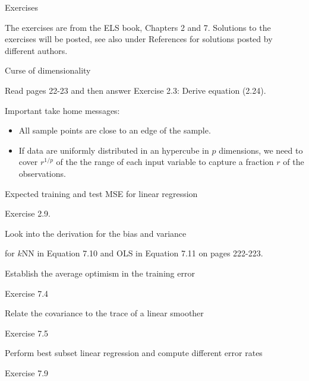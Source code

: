 \documentclass[
  ignorenonframetext,
]{beamer}
\providecommand{\tightlist}{%
  \setlength{\itemsep}{0pt}\setlength{\parskip}{0pt}}
\begin{document}
\begin{frame}{Exercises}
\protect\hypertarget{exercises}{}

The exercises are from the ELS book, Chapters 2 and 7. Solutions to the
exercises will be posted, see also under References for solutions posted
by different authors.

\begin{block}{Curse of dimensionality}

Read pages 22-23 and then answer Exercise 2.3: Derive equation (2.24).

Important take home messages:

\begin{itemize}
\tightlist
\item
  All sample points are close to an edge of the sample.
\item
  If data are uniformly distributed in an hypercube in \(p\) dimensions,
  we need to cover \(r^{1/p}\) of the the range of each input variable
  to capture a fraction \(r\) of the observations.
\end{itemize}

\end{block}

\begin{block}{Expected training and test MSE for linear regression}

Exercise 2.9.

\end{block}

\end{frame}

\begin{frame}

\begin{block}{Look into the derivation for the bias and variance}

for \(k\)NN in Equation 7.10 and OLS in Equation 7.11 on pages 222-223.

\end{block}

\begin{block}{Establish the average optimism in the training error}

Exercise 7.4

\end{block}

\begin{block}{Relate the covariance to the trace of a linear smoother}

Exercise 7.5

\end{block}

\begin{block}{Perform best subset linear regression and compute
different error rates}

Exercise 7.9

\end{block}

\end{frame}
\end{document}
